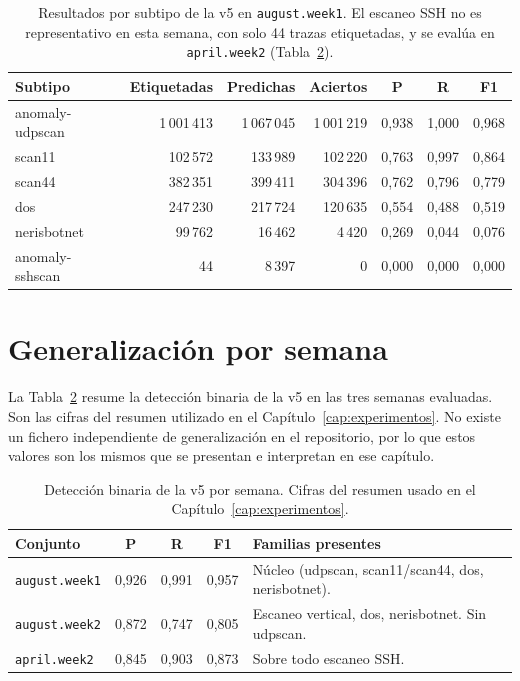 \begin{table}[ht]
\centering
\small
\begin{tabular}{|l|r|r|r|c|c|c|}
\hline
\textbf{Subtipo} & \textbf{Etiquetadas} & \textbf{Predichas} & \textbf{Aciertos} & \textbf{P} & \textbf{R} & \textbf{F1} \\
\hline
anomaly-udpscan & 1\,001\,413 & 1\,067\,045 & 1\,001\,219 & 0,938 & 1,000 & 0,968 \\
\hline
scan11 & 102\,572 & 133\,989 & 102\,220 & 0,763 & 0,997 & 0,864 \\
\hline
scan44 & 382\,351 & 399\,411 & 304\,396 & 0,762 & 0,796 & 0,779 \\
\hline
dos & 247\,230 & 217\,724 & 120\,635 & 0,554 & 0,488 & 0,519 \\
\hline
nerisbotnet & 99\,762 & 16\,462 & 4\,420 & 0,269 & 0,044 & 0,076 \\
\hline
anomaly-sshscan & 44 & 8\,397 & 0 & 0,000 & 0,000 & 0,000 \\
\hline
\end{tabular}
\caption{Resultados por subtipo de la v5 en \texttt{august.week1}. El escaneo SSH no es representativo en esta semana, con solo 44 trazas etiquetadas, y se evalúa en \texttt{april.week2} (Tabla~\ref{tab:apc_general}).}
\label{tab:apc_familia}
\end{table}

\section{Generalización por semana}
\label{sec:apc_general}

La Tabla~\ref{tab:apc_general} resume la detección binaria de la v5 en las tres semanas evaluadas. Son las cifras del resumen utilizado en el Capítulo~\ref{cap:experimentos}. No existe un fichero independiente de generalización en el repositorio, por lo que estos valores son los mismos que se presentan e interpretan en ese capítulo.

\begin{table}[ht]
\centering
\small
\begin{tabular}{|l|c|c|c|p{5.0cm}|}
\hline
\textbf{Conjunto} & \textbf{P} & \textbf{R} & \textbf{F1} & \textbf{Familias presentes} \\
\hline
\texttt{august.week1} & 0,926 & 0,991 & 0,957 & Núcleo (udpscan, scan11/scan44, dos, nerisbotnet). \\
\hline
\texttt{august.week2} & 0,872 & 0,747 & 0,805 & Escaneo vertical, dos, nerisbotnet. Sin udpscan. \\
\hline
\texttt{april.week2} & 0,845 & 0,903 & 0,873 & Sobre todo escaneo SSH. \\
\hline
\end{tabular}
\caption{Detección binaria de la v5 por semana. Cifras del resumen usado en el Capítulo~\ref{cap:experimentos}.}
\label{tab:apc_general}
\end{table}

